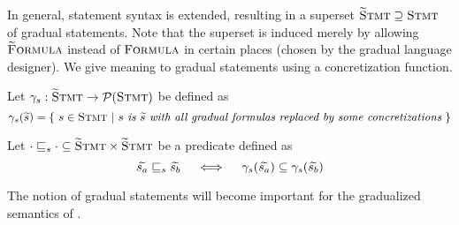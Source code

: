 In general, statement syntax is extended, resulting in a superset $\textup{\textsc{\ensuremath{\widetilde{\text{S}}}tmt}} \supseteq \textup{\textsc{Stmt}}$ of gradual statements.
Note that the superset is induced merely by allowing $\textup{\textsc{\ensuremath{\widetilde{\text{F}}}ormula}}$ instead of $\textup{\textsc{Formula}}$ in certain places (chosen by the gradual language designer).
We give meaning to gradual statements using a concretization function. %
\begin{definition}
    Let $\gamma_s : \textup{\textsc{\ensuremath{\widetilde{\text{S}}}tmt}} \rightarrow \mathcal{P}(\textup{\textsc{Stmt}})$ be defined as
    \begin{displaymath}
    \gamma_s(\widetilde{s}) = \{~ s \in \textup{\textsc{Stmt}} ~|~ \textit{$s$ is $\widetilde{s}$ with all gradual formulas replaced by some concretizations} ~\}
    \end{displaymath}
\end{definition}
\begin{definition}
    Let $\cdot \sqsubseteq_s \cdot \subseteq \textup{\textsc{\ensuremath{\widetilde{\text{S}}}tmt}} \times \textup{\textsc{\ensuremath{\widetilde{\text{S}}}tmt}}$ be a predicate defined as
    $$\widetilde{s_a} \sqsubseteq_s \widetilde{s_b}  \quad\iff\quad  \gamma_s(\widetilde{s_a}) \subseteq \gamma_s(\widetilde{s_b})$$
\end{definition}

The notion of gradual statements will become important for the gradualized semantics of \gvl.
